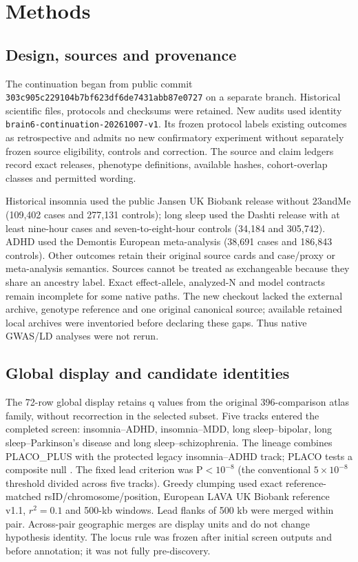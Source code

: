 \documentclass[11pt]{article}
\begin{document}
\section*{Methods}
\subsection*{Design, sources and provenance}
The continuation began from public commit \texttt{303c905c229104b7bf623df6de7431abb87e0727} on a separate branch. Historical scientific files, protocols and checksums were retained. New audits used identity \texttt{brain6-continuation-20261007-v1}. Its frozen protocol labels existing outcomes as retrospective and admits no new confirmatory experiment without separately frozen source eligibility, controls and correction. The source and claim ledgers record exact releases, phenotype definitions, available hashes, cohort-overlap classes and permitted wording.

Historical insomnia used the public Jansen UK Biobank release without 23andMe (109,402 cases and 277,131 controls); long sleep used the Dashti release with at least nine-hour cases and seven-to-eight-hour controls (34,184 and 305,742). ADHD used the Demontis European meta-analysis (38,691 cases and 186,843 controls). Other outcomes retain their original source cards and case/proxy or meta-analysis semantics. Sources cannot be treated as exchangeable because they share an ancestry label. Exact effect-allele, analyzed-N and model contracts remain incomplete for some native paths. The new checkout lacked the external archive, genotype reference and one original canonical source; available retained local archives were inventoried before declaring these gaps. Thus native GWAS/LD analyses were not rerun.

\subsection*{Global display and candidate identities}
The 72-row global display retains q values from the original 396-comparison atlas family, without recorrection in the selected subset. Five tracks entered the completed screen: insomnia--ADHD, insomnia--MDD, long sleep--bipolar, long sleep--Parkinson's disease and long sleep--schizophrenia. The lineage combines PLACO\_PLUS with the protected legacy insomnia--ADHD track; PLACO tests a composite null \cite{placo}. The fixed lead criterion was P$<10^{-8}$ (the conventional $5\times10^{-8}$ threshold divided across five tracks). Greedy clumping used exact reference-matched rsID/chromosome/position, European LAVA UK Biobank reference v1.1, $r^2=0.1$ and 500-kb windows. Lead flanks of 500 kb were merged within pair. Across-pair geographic merges are display units and do not change hypothesis identity. The locus rule was frozen after initial screen outputs and before annotation; it was not fully pre-discovery.
\end{document}
